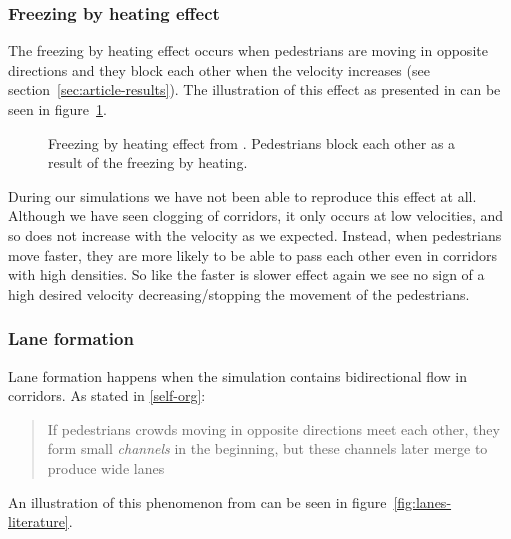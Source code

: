 \subsubsection{Freezing by heating effect}
The freezing by heating effect occurs when pedestrians are moving in opposite 
directions and they block each other when the velocity increases (see 
section~\ref{sec:article-results}). The illustration of this effect as 
presented in \cite{oscil} can be seen in 
figure~\ref{fig:freezing_by_heating_litterature}.

\begin{figure}[h]
    \centering
    \caption[Freezing by heating effect from \cite{oscil}]{Freezing by heating 
    effect from \cite{oscil}. Pedestrians block each other as a result of the 
    freezing by heating.}
    \label{fig:freezing_by_heating_litterature}
\end{figure}

During our simulations we have not been able to reproduce this effect at all.  
Although we have seen clogging of corridors, it only occurs at low velocities, 
and so does not increase with the velocity as we expected. Instead, when 
pedestrians move faster, they are more likely to be able to pass each other 
even in corridors with high densities. So like the faster is slower
effect again we see no sign of a high desired velocity decreasing/stopping
the movement of the pedestrians.

\subsubsection{Lane formation}
Lane formation happens when the simulation contains bidirectional flow in 
corridors. As stated in \ref{self-org}:

\begin{quote}
    If pedestrians crowds moving in opposite directions meet each other, they 
    form small \emph{channels} in the beginning, but these channels later 
    merge to produce wide lanes
\end{quote}

An illustration of this phenomenon from \cite{lanes} can be seen in 
figure~\ref{fig:lanes-literature}. 

